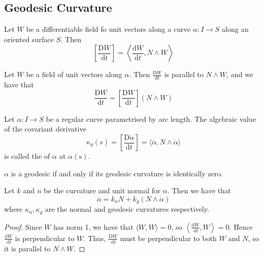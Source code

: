 \documentclass[10pt]{article}
\begin{document}
\subsection{Geodesic Curvature}

\begin{definition}
    Let $W$ be a differentiable field fo unit vectors along a curve $\alpha: I \rightarrow S$ along an oriented surface $S$. Then
$$
\left[\frac{\mathrm{D} W}{\mathrm{d} t}\right]=\left\langle\frac{\mathrm{d} W}{\mathrm{d} t}, N \wedge W\right\rangle
$$
\end{definition}

\begin{proposition}
Let $W$ be a field of unit vectors along $\alpha$. Then $\frac{\mathrm{D} W}{\mathrm{d} t}$ is parallel to $N \wedge W$, and we have that
$$
\frac{\mathrm{D} W}{\mathrm{d} t}=\left[\frac{\mathrm{D} W}{\mathrm{d} t}\right](N \wedge W)
$$
\end{proposition}

\begin{definition}
    Let $\alpha: I \rightarrow S$ be a regular curve parametrised by arc length. The algebraic value of the covariant derivative
$$
\kappa_g(s)=\left[\frac{\mathrm{D} \dot{\alpha}}{\mathrm{d} t}\right]=\langle\ddot{\alpha}, N \wedge \dot{\alpha}\rangle
$$
is called the  of $\alpha$ at $\alpha(\mathrm{s})$.
\end{definition}

\begin{proposition}
    $\alpha$ is a geodesic if and only if its geodesic curvature is identically zero.
\end{proposition}

\begin{proposition}
    Let $k$ and $n$ be the curvature and unit normal for $\alpha$. Then we have that
$$
\ddot{\alpha}=k_n N+k_g(N \wedge \dot{\alpha})
$$
where $\kappa_n, \kappa_g$ are the normal and geodesic curvatures respectively.
\end{proposition}
\begin{proof}
    Since $W$ has norm 1, we have that $\langle W, W\rangle=0$, so $\left\langle\frac{\mathrm{d} W}{\mathrm{~d} t}, W\right\rangle=0$. Hence $\frac{\mathrm{d} W}{\mathrm{~d} t}$ is perpendicular to $W$. Thus, $\frac{\mathrm{D} W}{\mathrm{~d} t}$ must be perpendicular to both $W$ and $N$, so it is parallel to $N \wedge W$.
\end{proof}
\end{document}
